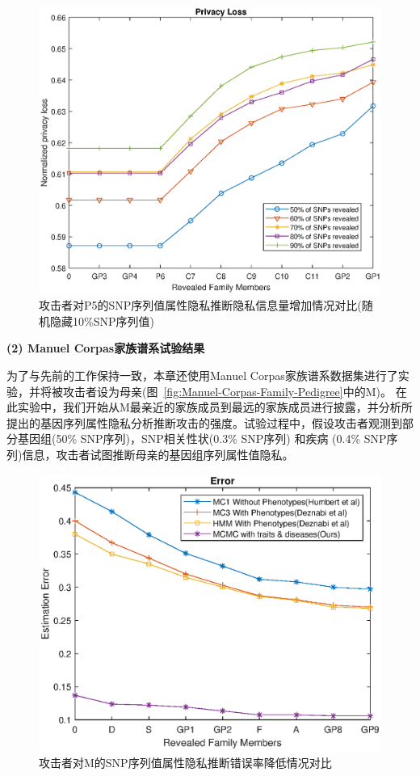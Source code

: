 \begin{figure}[htbp]
	\centering
	\includegraphics[width=0.8\linewidth]{./figures/P5privacyloss3.eps}
	\centering
	\caption{攻击者对P5的SNP序列值属性隐私推断隐私信息量增加情况对比(随机隐藏10\%SNP序列值)}\label{fig:P5privacyloss3}
\end{figure}


\textbf{(2) Manuel Corpas家族谱系试验结果}

为了与先前的工作保持一致，本章还使用Manuel Corpas家族谱系数据集进行了实验，并将被攻击者设为母亲(图~\ref{fig:Manuel-Corpas-Family-Pedigree}中的M)。 在此实验中，我们开始从M最亲近的家族成员到最远的家族成员进行披露，并分析所提出的基因序列属性隐私分析推断攻击的强度。试验过程中，假设攻击者观测到部分基因组(50\% SNP序列)，SNP相关性状(0.3\% SNP序列) 和疾病 (0.4\% SNP序列)信息，攻击者试图推断母亲的基因组序列属性值隐私。

\begin{figure}[htbp]
	\centering
	\includegraphics[width=0.8\linewidth]{./figures/Merror1.eps}
	\centering
	\caption{攻击者对M的SNP序列值属性隐私推断错误率降低情况对比}\label{fig:Merror1}
\end{figure}



